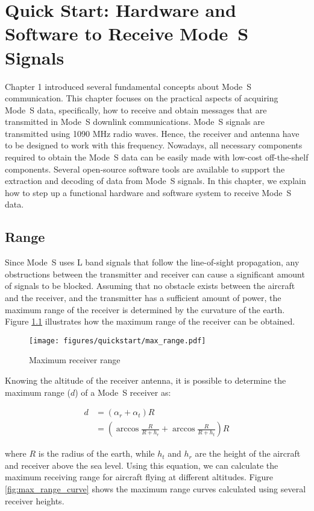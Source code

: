 \chapter{Quick Start: Hardware and Software to Receive Mode~S Signals}
\label{chap:quickstart}

Chapter 1 introduced several fundamental concepts about Mode~S communication. This chapter focuses on the practical aspects of acquiring Mode~S data, specifically, how to receive and obtain messages that are transmitted in Mode~S downlink communications. Mode~S signals are transmitted using 1090 MHz radio waves. Hence, the receiver and antenna have to be designed to work with this frequency. Nowadays, all necessary components required to obtain the Mode~S data can be easily made with low-cost off-the-shelf components. Several open-source software tools are available to support the extraction and decoding of data from Mode~S signals. In this chapter, we explain how to step up a functional hardware and software system to receive Mode~S data.

\section{Range}
Since Mode~S uses L band signals that follow the line-of-sight propagation, any obstructions between the transmitter and receiver can cause a significant amount of signals to be blocked. Assuming that no obstacle exists between the aircraft and the receiver, and the transmitter has a sufficient amount of power, the maximum range of the receiver is determined by the curvature of the earth. Figure \ref{fig:max_range} illustrates how the maximum range of the receiver can be obtained.

\begin{figure}[ht]
\centering
\texttt{[image: figures/quickstart/max\_range.pdf]}
\caption{Maximum receiver range}
\label{fig:max_range}
\end{figure}


Knowing the altitude of the receiver antenna, it is possible to determine the maximum range ($d$) of a Mode~S receiver as:

\begin{align}
  d &= (\alpha_r + \alpha_t) R \\
  & = \left( \arccos \frac{R}{R+h_r} + \arccos \frac{R}{R+h_t} \right) R
\end{align}

\noindent where $R$ is the radius of the earth, while $h_t$ and $h_r$ are the height of the aircraft and receiver above the sea level. Using this equation, we can calculate the maximum receiving range for aircraft flying at different altitudes. Figure \ref{fig:max_range_curve} shows the maximum range curves calculated using several receiver heights.


